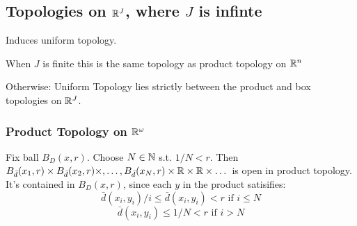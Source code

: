 \subsection{Topologies on $\mathbb{R}^J$, where $J$ is infinte}


Induces uniform topology.

When $J$ is finite this is the same topology as product topology on $\mathbb{R}^n$

Otherwise: Uniform Topology lies strictly between the product and box topologies on $\mathbb{R}^J$.

\subsubsection{Product Topology on $\mathbb{R}^\omega$}

Fix ball $B_D(x,r)$. Choose $N \in \mathbb{N}$ s.t. $1/N < r$. Then $B_{\bar{d}}(x_1,r) \times B_{\bar{d}}(x_2,r)\times,\dots,B_{\bar{d}}(x_N,r)\times \mathbb{R} \times \mathbb{R} \times \dots$
is open in product topology. It's contained in $B_D(x,r)$, since each $y$ in the product satisifies:
\[\bar{d}(x_i, y_i)/i \leq \bar{d}(x_i,y_i)<r \text{ if } i \leq N\]
\[\bar{d}(x_i,y_i) \leq 1/N < r \text{ if } i >N\]
